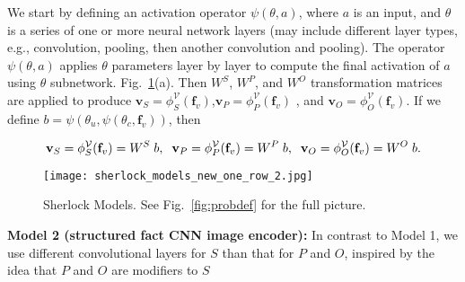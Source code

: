 \documentclass[runningheads]{llncs}
\begin{document}
We start by defining an activation operator $\psi(\theta, a)$, where $a$ is an input, and $\theta$ is a series of one or more neural network layers (may include different layer types, e.g.,  convolution,  pooling, then another convolution and pooling). The operator $\psi(\theta, a)$ applies $\theta$  parameters layer by layer to compute the final activation of $a$ using $\theta$  subnetwork. %
Fig.~\ref{fig:mdls2}(a).
Then $W^S$,  $W^P$, and $W^O$ transformation matrices are applied to produce $\mathbf{v}_S = \phi_S^\mathcal{V}(\mathbf{f}_v)$,$\mathbf{v}_P =\phi_P^\mathcal{V}(\mathbf{f}_v)$ , and $\mathbf{v}_O =\phi_O^\mathcal{V}(\mathbf{f}_v)$. If we define $b = \psi( \theta_u, \psi(\theta_c, \mathbf{f}_v))$, then
\begin{comment}
\begin{equation}
\small
\begin{split}
&\phi_S^\mathcal{V}(\mathbf{f}_v) =  W^S \psi( \theta_u, \psi(\theta_c, \mathbf{f}_v)),
\phi_P^\mathcal{V}(\mathbf{f}_v) =  W^P\psi( \theta_u, \psi(\theta_c, \mathbf{f}_v)), \\ &
\phi_O^\mathcal{V}(\mathbf{f}_v) =  W^O\psi( \theta_u, \psi(\theta_c, \mathbf{f}_v))
\end{split}
\label{eq_mdl1}
\end{equation}
\begin{equation}
\small
b = \psi( \theta_v^u, \psi(\theta_v^c, \mathbf{f}_v)), \;\;
 \phi_S^\mathcal{V}(\mathbf{f}_v) =  W_v^S \; b,  \;\;
\phi_P^\mathcal{V}(\mathbf{f}_v) =  W_v^P \; b,   \;\;
\phi_O^\mathcal{V}(\mathbf{f}_v) =  W_v^O \; b.
\label{eq_mdl1}
\end{equation}
\end{comment}\begin{equation}
\small
\mathbf{v}_S = \phi_S^\mathcal{V}(\mathbf{f}_v) =  W^S \; b,  \;\;
\mathbf{v}_P= \phi_P^\mathcal{V}(\mathbf{f}_v) =  W^P \; b,   \;\;
\mathbf{v}_O= \phi_O^\mathcal{V}(\mathbf{f}_v) =  W^O \; b.
\label{eq_mdl1}
\end{equation}\begin{figure}[t!]
\begin{center}
\vspace{-10mm}
 \texttt{[image: sherlock\_models\_new\_one\_row\_2.jpg]}
\end{center}
 \vspace{-4mm}
 \caption{Sherlock Models. See Fig.~\ref{fig:probdef} for the full picture.}
 \vspace{-5mm}
\label{fig:mdls2}
\end{figure}\vspace{-1mm}\noindent\textbf{Model 2 (structured fact CNN image encoder): } In contrast to Model 1, we use different convolutional layers for $S$ than that for $P$ and $O$, inspired by the idea that $P$ and $O$ are modifiers to $S$%
\end{document}
